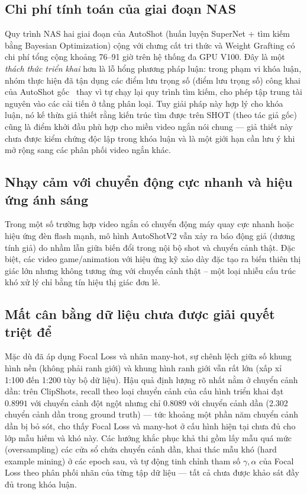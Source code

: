 \subsection{Chi phí tính toán của giai đoạn NAS}
Quy trình NAS hai giai đoạn của AutoShot (huấn luyện SuperNet + tìm kiếm bằng Bayesian Optimization) cộng với chưng cất tri thức và Weight Grafting có chi phí tổng cộng khoảng 76--91 giờ trên hệ thống đa GPU V100. Đây là một \textit{thách thức triển khai} hơn là lỗ hổng phương pháp luận: trong phạm vi khóa luận, nhóm thực hiện đã tận dụng các điểm lưu trọng số (điểm lưu trọng số) công khai của AutoShot gốc~\cite{zhu2023autoshot} thay vì tự chạy lại quy trình tìm kiếm, cho phép tập trung tài nguyên vào các cải tiến ở tầng phân loại. Tuy giải pháp này hợp lý cho khóa luận, nó kế thừa giả thiết rằng kiến trúc tìm được trên SHOT (theo tác giả gốc) cũng là điểm khởi đầu phù hợp cho miền video ngắn nói chung --- giả thiết này chưa được kiểm chứng độc lập trong khóa luận và là một giới hạn cần lưu ý khi mở rộng sang các phân phối video ngắn khác.

\subsection{Nhạy cảm với chuyển động cực nhanh và hiệu ứng ánh sáng}
Trong một số trường hợp video ngắn có chuyển động máy quay cực nhanh hoặc hiệu ứng đèn flash mạnh, mô hình AutoShotV2 vẫn xảy ra báo động giả (dương tính giả) do nhầm lẫn giữa biến đổi trong nội bộ shot và chuyển cảnh thật. Đặc biệt, các video game/animation với hiệu ứng kỹ xảo dày đặc tạo ra biến thiên thị giác lớn nhưng không tương ứng với chuyển cảnh thật -- một loại nhiễu cấu trúc khó xử lý chỉ bằng tín hiệu thị giác đơn lẻ.

\subsection{Mất cân bằng dữ liệu chưa được giải quyết triệt để}
Mặc dù đã áp dụng Focal Loss và nhãn many-hot, sự chênh lệch giữa số khung hình nền (không phải ranh giới) và khung hình ranh giới vẫn rất lớn (xấp xỉ 1:100 đến 1:200 tùy bộ dữ liệu). Hậu quả định lượng rõ nhất nằm ở chuyển cảnh dần: trên ClipShots, recall theo loại chuyển cảnh của cấu hình triển khai đạt $0.8991$ với chuyển cảnh đột ngột nhưng chỉ $0.8089$ với chuyển cảnh dần (2.302 chuyển cảnh dần trong ground truth) --- tức khoảng một phần năm chuyển cảnh dần bị bỏ sót, cho thấy Focal Loss và many-hot ở cấu hình hiện tại chưa đủ cho lớp mẫu hiếm và khó này. Các hướng khắc phục khả thi gồm lấy mẫu quá mức (oversampling) các cửa sổ chứa chuyển cảnh dần, khai thác mẫu khó (hard example mining) ở các epoch sau, và tự động tinh chỉnh tham số $\gamma, \alpha$ của Focal Loss theo phân phối nhãn của từng tập dữ liệu --- tất cả chưa được khảo sát đầy đủ trong khóa luận.

